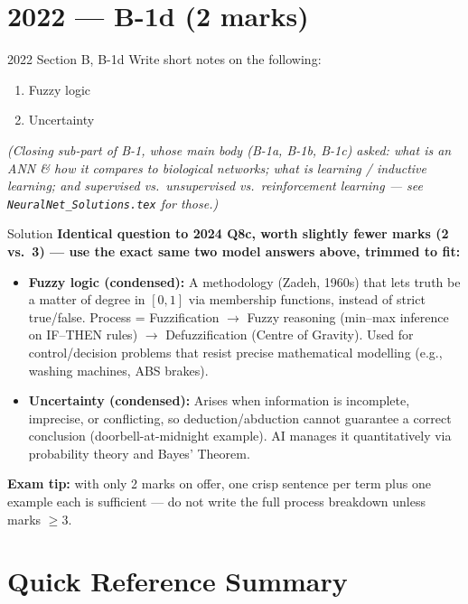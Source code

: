 \documentclass[12pt,a4paper]{article}
\begin{document}
\newpage
\section{2022 --- B-1d (2 marks)}

\begin{qbox}{2022 Section B, B-1d}
Write short notes on the following:
\begin{enumerate}[label=\roman*)]
  \item Fuzzy logic
  \item Uncertainty
\end{enumerate}
\textit{(Closing sub-part of B-1, whose main body (B-1a, B-1b, B-1c) asked: what is an ANN \& how it compares to biological networks; what is learning / inductive learning; and supervised vs.\ unsupervised vs.\ reinforcement learning --- see \texttt{NeuralNet\_Solutions.tex} for those.)}
\end{qbox}

\begin{solbox}{Solution}
\textbf{Identical question to 2024 Q8c, worth slightly fewer marks (2 vs.\ 3) --- use the exact same two model answers above, trimmed to fit:}
\begin{itemize}[noitemsep]
  \item \textbf{Fuzzy logic (condensed):} A methodology (Zadeh, 1960s) that lets truth be a matter of degree in $[0,1]$ via membership functions, instead of strict true/false. Process = Fuzzification $\to$ Fuzzy reasoning (min--max inference on IF--THEN rules) $\to$ Defuzzification (Centre of Gravity). Used for control/decision problems that resist precise mathematical modelling (e.g., washing machines, ABS brakes).
  \item \textbf{Uncertainty (condensed):} Arises when information is incomplete, imprecise, or conflicting, so deduction/abduction cannot guarantee a correct conclusion (doorbell-at-midnight example). AI manages it quantitatively via probability theory and Bayes' Theorem.
\end{itemize}
\textbf{Exam tip:} with only 2 marks on offer, one crisp sentence per term plus one example each is sufficient --- do not write the full process breakdown unless marks $\geq 3$.
\end{solbox}

\newpage
\section*{Quick Reference Summary}
\end{document}
